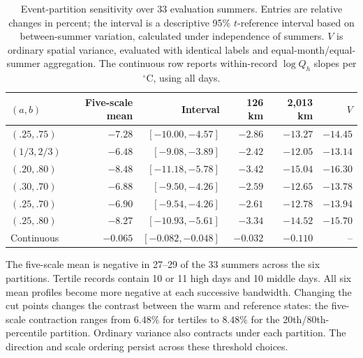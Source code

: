\documentclass[namedate,webpdf,modern,mediumone]{oup-authoring-template}
\theoremstyle{thmstyleone}
\begin{document}
\begin{table}[!htbp]
\centering\small
\caption{Event-partition sensitivity over 33 evaluation summers. Entries are
relative changes in percent; the interval is a descriptive 95\% $t$-reference
interval based on between-summer variation, calculated under independence
of summers. $V$ is ordinary spatial variance, evaluated with identical
labels and equal-month/equal-summer aggregation. The continuous row reports
within-record $\log Q_h$ slopes per $^\circ$C, using all days.}
\begin{tabular}{@{}lrrrrr@{}}
\toprule
$(a,b)$ & Five-scale mean & Interval & 126 km & 2,013 km & $V$\\
\midrule
$(.25,.75)$ & $-7.28$ & $[-10.00,-4.57]$ & $-2.86$ & $-13.27$ & $-14.45$ \\
$(1/3,2/3)$ & $-6.48$ & $[-9.08,-3.89]$ & $-2.42$ & $-12.05$ & $-13.14$ \\
$(.20,.80)$ & $-8.48$ & $[-11.18,-5.78]$ & $-3.42$ & $-15.04$ & $-16.30$ \\
$(.30,.70)$ & $-6.88$ & $[-9.50,-4.26]$ & $-2.59$ & $-12.65$ & $-13.78$ \\
$(.25,.70)$ & $-6.90$ & $[-9.54,-4.26]$ & $-2.61$ & $-12.78$ & $-13.94$ \\
$(.25,.80)$ & $-8.27$ & $[-10.93,-5.61]$ & $-3.34$ & $-14.52$ & $-15.70$ \\
Continuous & $-0.065$ & $[-0.082,-0.048]$ & $-0.032$ & $-0.110$ & -- \\
\bottomrule
\end{tabular}
\end{table}

The five-scale mean is negative in 27--29 of the 33 summers across the six
partitions. Tertile records contain 10 or 11 high days and 10 middle days.
All six mean profiles become more negative at each successive bandwidth.
Changing the cut points changes the contrast between the warm and reference
states: the five-scale contraction ranges from $6.48\%$ for tertiles to
$8.48\%$ for the 20th/80th-percentile partition. Ordinary variance also
contracts under each partition. The direction and scale ordering persist
across these threshold choices.




\end{document}
